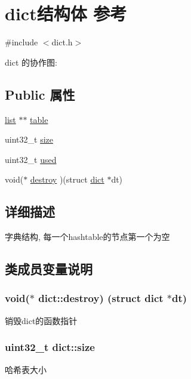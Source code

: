 \hypertarget{structdict}{}\section{dict结构体 参考}
\label{structdict}


{\ttfamily \#include $<$dict.\+h$>$}



dict 的协作图\+:
\subsection*{Public 属性}
\begin{DoxyCompactItemize}
\item 
\hyperlink{structlist}{list} $\ast$$\ast$ \hyperlink{structdict_a337bb4468f938b34de9173822a143b80}{table}
\item 
uint32\+\_\+t \hyperlink{structdict_a23a3a7a6a87615513d9f8f90eadb5ead}{size}
\item 
uint32\+\_\+t \hyperlink{structdict_abd9079c1d7e55aee509c93f4239f5690}{used}
\item 
void($\ast$ \hyperlink{structdict_a9fb58216986ac6b2d00599c7a7f166a7}{destroy} )(struct \hyperlink{structdict}{dict} $\ast$dt)
\end{DoxyCompactItemize}


\subsection{详细描述}
字典结构, 每一个hashtable的节点第一个为空 

\subsection{类成员变量说明}
\subsubsection[{\texorpdfstring{destroy}{destroy}}]{\setlength{\rightskip}{0pt plus 5cm}void($\ast$ dict\+::destroy) (struct {\bf dict} $\ast$dt)}\hypertarget{structdict_a9fb58216986ac6b2d00599c7a7f166a7}{}\label{structdict_a9fb58216986ac6b2d00599c7a7f166a7}
销毁dict的函数指针 
\subsubsection[{\texorpdfstring{size}{size}}]{\setlength{\rightskip}{0pt plus 5cm}uint32\+\_\+t dict\+::size}\hypertarget{structdict_a23a3a7a6a87615513d9f8f90eadb5ead}{}\label{structdict_a23a3a7a6a87615513d9f8f90eadb5ead}
哈希表大小 

